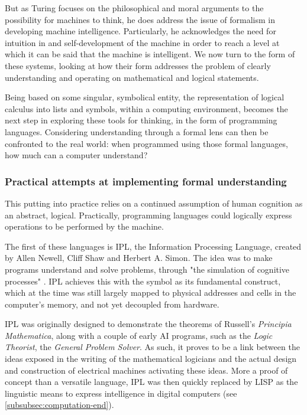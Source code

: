 But as Turing focuses on the philosophical and moral arguments to the possibility for machines to think, he does address the issue of formalism in developing machine intelligence. Particularly, he acknowledges the need for intuition in and self-development of the machine in order to reach a level at which it can be said that the machine is intelligent. We now turn to the form of these systems, looking at how their form addresses the problem of clearly understanding and operating on mathematical and logical statements.

Being based on some singular, symbolical entity, the representation of logical calculus into lists and symbols, within a computing environment, becomes the next step in exploring these tools for thinking, in the form of programming languages. Considering understanding through a formal lens can then be confronted to the real world: when programmed using those formal languages, how much can a computer understand?

\subsubsection{Practical attempts at implementing formal understanding}
\label{subsubsec:practical-understanding}

This putting into practice relies on a continued assumption of human cognition as an abstract, logical. Practically, programming languages could logically express operations to be performed by the machine.

The first of these languages is IPL, the Information Processing Language, created by Allen Newell, Cliff Shaw and Herbert A. Simon.  The idea was to make programs understand and solve problems, through "the simulation of cognitive processes" \citep{newell_information_1964}. IPL achieves this with the symbol as its fundamental construct, which at the time was still largely mapped to physical addresses and cells in the computer's memory, and not yet decoupled from hardware.

IPL was originally designed to demonstrate the theorems of Russell's \emph{Principia Mathematica}, along with a couple of early AI programs, such as the \emph{Logic Theorist}, the \emph{General Problem Solver}. As such, it proves to be a link between the ideas exposed in the writing of the mathematical logicians and the actual design and construction of electrical machines activating these ideas. More a proof of concept than a versatile language, IPL was then quickly replaced by LISP as the linguistic means to express intelligence in digital computers (see \ref{subsubsec:computation-end}).


